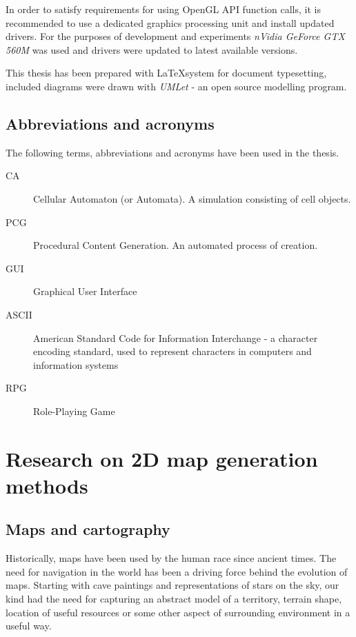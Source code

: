 \documentclass[12pt]{report}
\begin{document}
In order to satisfy requirements for using OpenGL API function calls, it is recommended to use a dedicated graphics processing unit and install updated drivers. For the purposes of development and experiments \textit{nVidia GeForce GTX 560M } was used and drivers were updated to latest available versions.
 
This thesis has been prepared with \LaTeX\space system for document typesetting, included diagrams were drawn with \textit{UMLet} - an open source modelling program.
 

\section{Abbreviations and acronyms} 

The following terms, abbreviations and acronyms have been used in the thesis.

\begin{description} 
	\item[CA] Cellular Automaton (or Automata). A simulation consisting of cell objects.
	\item[PCG] Procedural Content Generation. An automated process of creation.   
	\item[GUI] Graphical User Interface
	\item[ASCII] American Standard Code for Information Interchange - a character encoding standard, used to represent characters in computers and information systems
	\item[RPG] Role-Playing Game 
\end{description}

\chapter{Research on 2D map generation methods} \label{rozdzial.teoria}

\section{Maps and cartography} 

Historically, maps have been used by the human race since ancient times. The need for navigation in the world has been a driving force behind the evolution of maps. Starting with cave paintings and representations of stars on the sky, our kind had the need for capturing an abstract model of a territory, terrain shape, location of useful resources or some other aspect of surrounding environment in a useful way.
\end{document}
